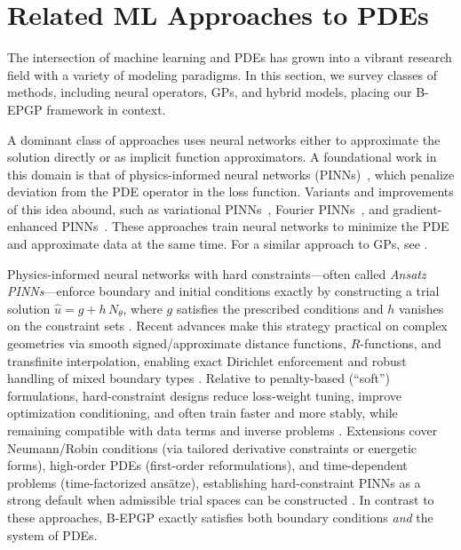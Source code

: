 \documentclass{article} %
\theoremstyle{plain}
\newtheorem{theorem}{Theorem}[section]
\theoremstyle{definition}
\theoremstyle{remark}
\begin{document}




\section{Related ML Approaches to PDEs}

The intersection of machine learning and PDEs has grown into a vibrant research field with a variety of modeling paradigms. In this section, we survey classes of methods, including neural operators, GPs, and hybrid models, placing our B-EPGP framework in context.

A dominant class of approaches uses neural networks either to approximate the solution directly or as implicit function approximators. A foundational work in this domain is that of physics-informed neural networks (PINNs)~\citep{raissi2019physics}, which penalize deviation from the PDE operator in the loss function. Variants and improvements of this idea abound, such as variational PINNs~\citep{Kharazmi2021}, Fourier PINNs~\citep{wang2021eigenvector}, and gradient-enhanced PINNs~\citep{yu2022gradient}.
These approaches train neural networks to minimize the PDE and approximate data at the same time.
For a similar approach to GPs, see \citep{chen2022apik}.

Physics-informed neural networks with hard constraints—often called \emph{Ansatz PINNs}—enforce boundary and initial conditions exactly by constructing a trial solution $\hat u = g + h\,N_\theta$, where $g$ satisfies the prescribed conditions and $h$ vanishes on the constraint sets \citep{Lagaris1997}. Recent advances make this strategy practical on complex geometries via smooth signed/approximate distance functions, $R$-functions, and transfinite interpolation, enabling exact Dirichlet enforcement and robust handling of mixed boundary types \citep{Sukumar2022,EPINN2023}. Relative to penalty-based (“soft”) formulations, hard-constraint designs reduce loss-weight tuning, improve optimization conditioning, and often train faster and more stably, while remaining compatible with data terms and inverse problems \citep{Heliyon2023,ExactVsSoft2023}. Extensions cover Neumann/Robin conditions (via tailored derivative constraints or energetic forms), high-order PDEs (first-order reformulations), and time-dependent problems (time-factorized ansätze), establishing hard-constraint PINNs as a strong default when admissible trial spaces can be constructed \citep{FOPINN2022,ATPINNHC2025}.
In contrast to these approaches, B-EPGP exactly satisfies both boundary conditions \emph{and} the system of PDEs.
\end{document}
